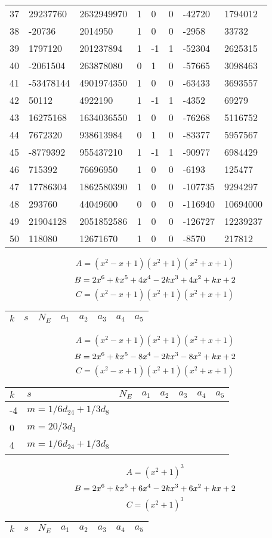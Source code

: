 \documentclass{amsart}
\begin{document}
\begin{longtable}{|l|l|l|lllll|}
37&29237760&2632949970&1&0&0&-42720&1794012\\
38&-20736&2014950&1&0&0&-2958&33732\\
39&1797120&201237894&1&-1&1&-52304&2625315\\
40&-2061504&263878080&0&1&0&-57665&3098463\\
41&-53478144&4901974350&1&0&0&-63433&3693557\\
42&50112&4922190&1&-1&1&-4352&69279\\
43&16275168&1634036550&1&0&0&-76268&5116752\\
44&7672320&938613984&0&1&0&-83377&5957567\\
45&-8779392&955437210&1&-1&1&-90977&6984429\\
46&715392&76696950&1&0&0&-6193&125477\\
47&17786304&1862580390&1&0&0&-107735&9294297\\
48&293760&44049600&0&0&0&-116940&10694000\\
49&21904128&2051852586&1&0&0&-126727&12239237\\
50&118080&12671670&1&0&0&-8570&217812\\
\hline
\end{longtable}
$$A=(x^2
 - x
 + 1)(x^2
 + 1)(x^2
 + x
 + 1)$$
$$B=2\*x^6
 + k\*x^5
 + 4\*x^4
 - 2\*k\*x^3
 + 4\*x^2
 + k\*x
 + 2$$
$$C=(x^2
 - x
 + 1)(x^2
 + 1)(x^2
 + x
 + 1)$$
\begin{longtable}{|l|l|l|lllll|}
\hline
$k$ & $s$ & $N_E$ & $a_1$ & $a_2$ & $a_3$ & $a_4$ & $a_5$\\
\hline
\hline
\end{longtable}
$$A=(x^2
 - x
 + 1)(x^2
 + 1)(x^2
 + x
 + 1)$$
$$B=2\*x^6
 + k\*x^5
 - 8\*x^4
 - 2\*k\*x^3
 - 8\*x^2
 + k\*x
 + 2$$
$$C=(x^2
 - x
 + 1)(x^2
 + 1)(x^2
 + x
 + 1)$$
\begin{longtable}{|l|l|l|lllll|}
\hline
$k$ & $s$ & $N_E$ & $a_1$ & $a_2$ & $a_3$ & $a_4$ & $a_5$\\
\hline
-4&$m=1/6d_{24}+1/3d_{8}$&&\multicolumn{5}{c|}{}\\
0&$m=20/3d_{3}$&&\multicolumn{5}{c|}{}\\
4&$m=1/6d_{24}+1/3d_{8}$&&\multicolumn{5}{c|}{}\\
\hline
\end{longtable}
$$A=(x^2
 + 1)^{3}$$
$$B=2\*x^6
 + k\*x^5
 + 6\*x^4
 - 2\*k\*x^3
 + 6\*x^2
 + k\*x
 + 2$$
$$C=(x^2
 + 1)^{3}$$
\begin{longtable}{|l|l|l|lllll|}
\hline
$k$ & $s$ & $N_E$ & $a_1$ & $a_2$ & $a_3$ & $a_4$ & $a_5$\\
\hline
\hline
\end{longtable}
\end{document}
